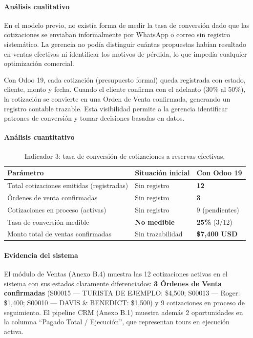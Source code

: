 \paragraph{Análisis cualitativo}
En el modelo previo, no existía forma de medir la tasa de conversión dado que las cotizaciones se enviaban informalmente por WhatsApp o correo sin registro sistemático. La gerencia no podía distinguir cuántas propuestas habían resultado en ventas efectivas ni identificar los motivos de pérdida, lo que impedía cualquier optimización comercial.

Con Odoo 19, cada cotización (presupuesto formal) queda registrada con estado, cliente, monto y fecha. Cuando el cliente confirma con el adelanto (30\% al 50\%), la cotización se convierte en una Orden de Venta confirmada, generando un registro contable trazable. Esta visibilidad permite a la gerencia identificar patrones de conversión y tomar decisiones basadas en datos.

\paragraph{Análisis cuantitativo}
\begin{table}[htbp]
\centering
\renewcommand{\arraystretch}{1.3}
\begin{tabular}{|p{5.5cm}|p{2.5cm}|p{2.5cm}|}
\hline
\textbf{Parámetro} & \textbf{Situación inicial} & \textbf{Con Odoo 19} \\ \hline
Total cotizaciones emitidas (registradas) & Sin registro & \textbf{12} \\ \hline
Órdenes de venta confirmadas & Sin registro & \textbf{3} \\ \hline
Cotizaciones en proceso (activas) & Sin registro & 9 (pendientes) \\ \hline
Tasa de conversión medible & \textbf{No medible} & \textbf{25\%} (3/12) \\ \hline
Monto total de ventas confirmadas & Sin trazabilidad & \textbf{\$7,400 USD} \\ \hline
\end{tabular}
\caption{Indicador 3: tasa de conversión de cotizaciones a reservas efectivas.}
\end{table}

\paragraph{Evidencia del sistema}
El módulo de Ventas (Anexo B.4) muestra las 12 cotizaciones activas en el sistema con sus estados claramente diferenciados: \textbf{3 Órdenes de Venta confirmadas} (S00015 --- TURISTA DE EJEMPLO: \$4,500; S00013 --- Roger: \$1,400; S00010 --- DAVIS \& BENEDICT: \$1,500) y 9 cotizaciones en proceso de seguimiento. El pipeline CRM (Anexo B.1) muestra además 2 oportunidades en la columna ``Pagado Total / Ejecución'', que representan tours en ejecución activa.

